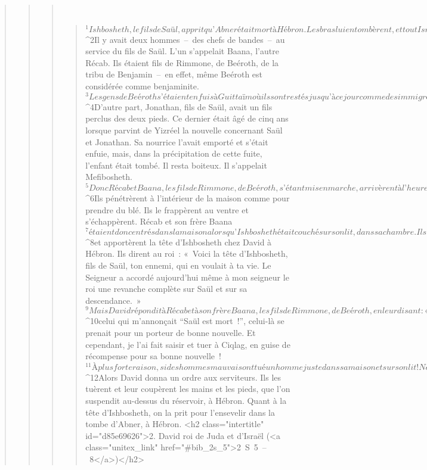 \begin{verse}
\begin{verse}
\begin{verse}
         
      \bchapter{}
      \begin{verse}
${}^{1}Ishbosheth, le fils de Saül, apprit qu’Abner était mort à Hébron. Les bras lui en tombèrent, et tout Israël fut bouleversé.
${}^{2}Il y avait deux hommes – des chefs de bandes – au service du fils de Saül. L’un s’appelait Baana, l’autre Récab. Ils étaient fils de Rimmone, de Beéroth, de la tribu de Benjamin – en effet, même Beéroth est considérée comme benjaminite. 
${}^{3}Les gens de Beéroth s’étaient enfuis à Guittaïm où ils sont restés jusqu’à ce jour comme des immigrés.
${}^{4}D’autre part, Jonathan, fils de Saül, avait un fils perclus des deux pieds. Ce dernier était âgé de cinq ans lorsque parvint de Yizréel la nouvelle concernant Saül et Jonathan. Sa nourrice l’avait emporté et s’était enfuie, mais, dans la précipitation de cette fuite, l’enfant était tombé. Il resta boiteux. Il s’appelait Mefibosheth.
       
${}^{5}Donc Récab et Baana, les fils de Rimmone, de Beéroth, s’étant mis en marche, arrivèrent à l’heure la plus chaude du jour à la maison d’Ishbosheth. Celui-ci était couché pour la sieste de midi. 
${}^{6}Ils pénétrèrent à l’intérieur de la maison comme pour prendre du blé. Ils le frappèrent au ventre et s’échappèrent. Récab et son frère Baana 
${}^{7}étaient donc entrés dans la maison alors qu’Ishbosheth était couché sur son lit, dans sa chambre. Ils l’avaient frappé à mort, décapité, et ils avaient pris sa tête. Ils marchèrent toute la nuit par le chemin de la Araba 
${}^{8}et apportèrent la tête d’Ishbosheth chez David à Hébron. Ils dirent au roi : « Voici la tête d’Ishbosheth, fils de Saül, ton ennemi, qui en voulait à ta vie. Le Seigneur a accordé aujourd’hui même à mon seigneur le roi une revanche complète sur Saül et sur sa descendance. »
${}^{9}Mais David répondit à Récab et à son frère Baana, les fils de Rimmone, de Beéroth, en leur disant : « Par le Seigneur vivant qui m’a racheté de toute détresse, 
${}^{10}celui qui m’annonçait “Saül est mort !”, celui-là se prenait pour un porteur de bonne nouvelle. Et cependant, je l’ai fait saisir et tuer à Ciqlag, en guise de récompense pour sa bonne nouvelle ! 
${}^{11}À plus forte raison, si des hommes mauvais ont tué un homme juste dans sa maison et sur son lit ! Ne faut-il pas maintenant que je réclame son sang qui est sur vos mains et que je vous balaie de la terre ? » 
${}^{12}Alors David donna un ordre aux serviteurs. Ils les tuèrent et leur coupèrent les mains et les pieds, que l’on suspendit au-dessus du réservoir, à Hébron. Quant à la tête d’Ishbosheth, on la prit pour l’ensevelir dans la tombe d’Abner, à Hébron.
      <h2 class="intertitle" id="d85e69626">2. David roi de Juda et d’Israël (<a class="unitex_link" href="#bib_2s_5">2 S 5 – 8</a>)</h2>
      

\end{verse}
\end{verse}
\end{verse}
\end{verse}

